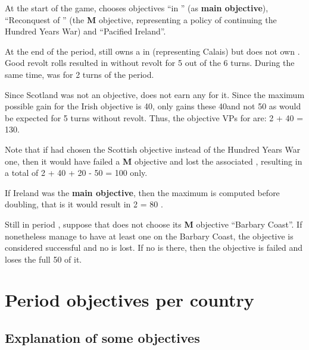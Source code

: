 \begin{exemple}
  At the start of the game, \ANG chooses objectives ``\Presidio in
  \provincePicardie'' (as \textbf{main objective}), ``Reconquest of
  \provinceGuyenne'' (the {\bf M} objective, representing a policy of
  continuing the Hundred Years War) and ``Pacified Ireland''.

  At the end of the period, \ANG still owns a \Presidio in \provincePicardie
  (representing Calais) but does not own \provinceGuyenne. Good revolt rolls
  resulted in \regionIrlande without revolt for 5 out of the 6 turns. During
  the same time, \paysEcosse was \VASSAL for 2 turns of the period.

  Since Scotland was not an objective, \ANG does not earn any \VP for
  it. Since the maximum possible gain for the Irish objective is 40\VPs, \ANG
  only gains these 40\VPs and not 50 as would be expected for 5 turns without
  revolt. Thus, the objective VPs for \ANG are: 2  + 40 =
  130\VPs.

  Note that if \ANG had chosen the Scottish objective instead of the Hundred
  Years War one, then it would have failed a {\bf M} objective and lost the
  associated \VPs, resulting in a total of 2   + 40 + 20 - 50
  = 100 \VPs only.

  If Ireland was the \textbf{main objective}, then the maximum is computed
  before doubling, that is it would result in 2  = 80 \VPs.
\end{exemple}

\begin{exemple}
  Still in period , suppose that \HIS does not choose its {\bf M}
  objective ``Barbary Coast''. If \HIS nonetheless manage to have at least one
  \Presidio on the Barbary Coast, the objective is considered successful and
  no \VP is lost. If no \Presidio is there, then the objective is failed and
  \HIS loses the full 50 \VPs of it.
\end{exemple}

\section{Period objectives per country}
\label{chVictories:objectives}

\subsection{Explanation of some objectives}

